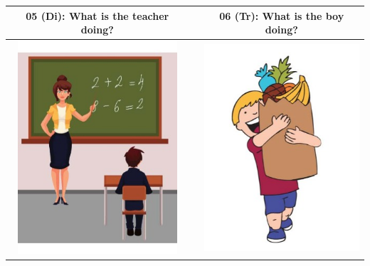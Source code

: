 \documentclass[12pt,notitlepage]{article}
\begin{document}
\begin{center}
\begin{tabular}{|c|c|c|}
\hline
05 (Di): What is the teacher doing? && 06 (Tr): What is the boy doing? \\
\hline
\includegraphics[width=16em,trim=0 0 0 -3]{figures/I05.jpg} & & \includegraphics[width=16em,trim=0 0 0 -3]{figures/I06.jpg} \\
\hline
\end{tabular}
\vspace{1em} \\



\end{center}
\end{document}
